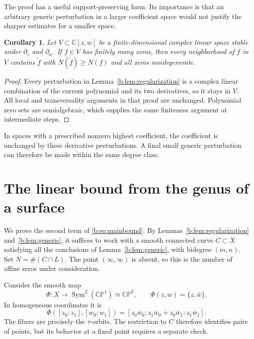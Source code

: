 \documentclass[UTF8,11pt]{ctexart}
\newtheorem{cor}[thm]{Corollary}
\theoremstyle{definition}
\numberwithin{equation}{section}
\newcommand{\C}{\mathbb C}\newcommand{\R}{\mathbb R}
\newcommand{\CP}{\mathbb {CP}}\newcommand{\cP}{\mathcal P}
\begin{document}
The proof has a useful support-preserving form. Its importance is that an
arbitrary generic perturbation in a larger coefficient space would not
justify the sharper estimates for a smaller space.
\begin{cor}\label{core:regularizationspace}
Let $V\subset\C[z,w]$ be a finite-dimensional complex linear space stable
under $\partial_z$ and $\partial_w$. If $f\in V$ has finitely many zeros,
then every neighborhood of $f$ in $V$ contains $\widetilde f$ with
$N(\widetilde f)\ge N(f)$ and all zeros nondegenerate.
\end{cor}
\begin{proof}
Every perturbation in Lemma~\ref{b:lem:regularization} is a complex linear
combination of the current polynomial and its two derivatives, so it
stays in $V$. All local and transversality arguments in that proof are
unchanged. Polynomial zero sets are semialgebraic, which supplies the
same finiteness argument at intermediate steps.
\end{proof}
In spaces with a prescribed nonzero highest coefficient, the coefficient
is unchanged by these derivative perturbations. A final small generic
perturbation can therefore be made within the same degree class.

\section{The linear bound from the genus of a surface}\label{b:sec:linear}

We prove the second term of \eqref{b:eq:mainbound}. By
Lemmas~\ref{b:lem:regularization} and~\ref{b:lem:generic}, it suffices to
work with a smooth connected curve $C\subset X$ satisfying all the
conclusions of Lemma~\ref{b:lem:generic}, with bidegree $(m,n)$.
Set $N=\#(C\cap L)$. The point $(\infty,\infty)$ is absent, so
this is the number of affine zeros under consideration.

Consider the smooth map
\begin{equation}\label{b:eq:quotient}
 \Phi:X\longrightarrow\operatorname{Sym}^2(\CP^1)\simeq\CP^2,
 \qquad \Phi(z,w)=\{z,\bar w\}.
\end{equation}
In homogeneous coordinates it is
\[
 \Phi([z_0:z_1],[w_0:w_1])
 =[z_0\bar w_0:z_1\bar w_0+z_0\bar w_1:z_1\bar w_1].
\]
The fibers are precisely the $\tau$-orbits. The restriction to $C$
therefore identifies pairs of points, but its behavior at a fixed
point requires a separate check.
\end{document}
